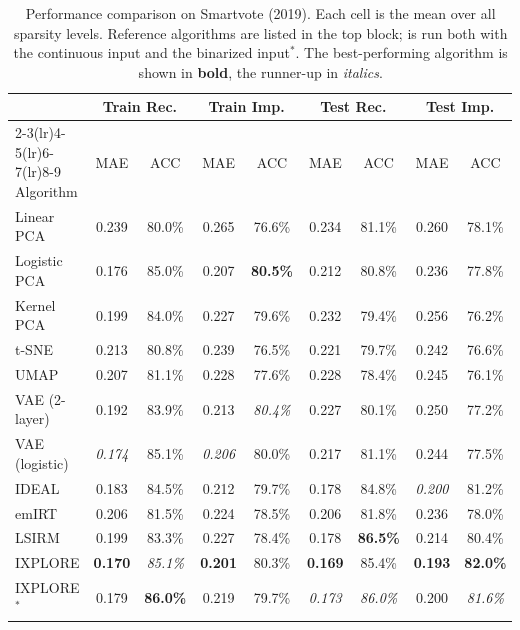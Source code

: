 \begin{table}[ht]
\centering
\caption{Performance comparison on Smartvote (2019). Each cell is the mean over all sparsity levels. Reference algorithms are listed in the top block; \IXPLORE is run both with the continuous input and the binarized input$^*$. The best-performing algorithm is shown in \textbf{bold}, the runner-up in \textit{italics}.}
\label{tab:baseline_smartvote_2019}
\small
\begin{tabular}{lcccccccc}
\toprule
 & \multicolumn{2}{c}{Train Rec.} & \multicolumn{2}{c}{Train Imp.} & \multicolumn{2}{c}{Test Rec.} & \multicolumn{2}{c}{Test Imp.} \\
\cmidrule(lr){2-3}\cmidrule(lr){4-5}\cmidrule(lr){6-7}\cmidrule(lr){8-9}
Algorithm & MAE & ACC & MAE & ACC & MAE & ACC & MAE & ACC \\
\midrule
Linear PCA & 0.239 & 80.0\% & 0.265 & 76.6\% & 0.234 & 81.1\% & 0.260 & 78.1\% \\
Logistic PCA & 0.176 & 85.0\% & 0.207 & \textbf{80.5\%} & 0.212 & 80.8\% & 0.236 & 77.8\% \\
Kernel PCA & 0.199 & 84.0\% & 0.227 & 79.6\% & 0.232 & 79.4\% & 0.256 & 76.2\% \\
t-SNE & 0.213 & 80.8\% & 0.239 & 76.5\% & 0.221 & 79.7\% & 0.242 & 76.6\% \\
UMAP & 0.207 & 81.1\% & 0.228 & 77.6\% & 0.228 & 78.4\% & 0.245 & 76.1\% \\
VAE (2-layer) & 0.192 & 83.9\% & 0.213 & \textit{80.4\%} & 0.227 & 80.1\% & 0.250 & 77.2\% \\
VAE (logistic) & \textit{0.174} & 85.1\% & \textit{0.206} & 80.0\% & 0.217 & 81.1\% & 0.244 & 77.5\% \\
IDEAL & 0.183 & 84.5\% & 0.212 & 79.7\% & 0.178 & 84.8\% & \textit{0.200} & 81.2\% \\
emIRT & 0.206 & 81.5\% & 0.224 & 78.5\% & 0.206 & 81.8\% & 0.236 & 78.0\% \\
LSIRM & 0.199 & 83.3\% & 0.227 & 78.4\% & 0.178 & \textbf{86.5\%} & 0.214 & 80.4\% \\
\midrule
IXPLORE & \textbf{0.170} & \textit{85.1\%} & \textbf{0.201} & 80.3\% & \textbf{0.169} & 85.4\% & \textbf{0.193} & \textbf{82.0\%} \\
IXPLORE$^*$ & 0.179 & \textbf{86.0\%} & 0.219 & 79.7\% & \textit{0.173} & \textit{86.0\%} & 0.200 & \textit{81.6\%} \\
\bottomrule
\end{tabular}
\end{table}
